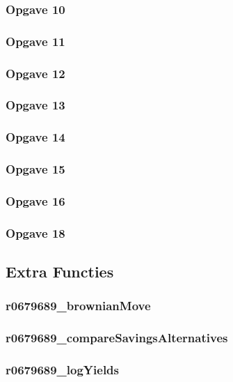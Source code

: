 \documentclass[11pt, a4paper, titlepage, openright]{article}
\begin{document}
		\subsubsection{Opgave 10}
			
		\bigskip
		\subsubsection{Opgave 11}
			
		\bigskip
		\subsubsection{Opgave 12}
			
		\bigskip
		\subsubsection{Opgave 13}
			
		\bigskip
		\subsubsection{Opgave 14}
			
		\bigskip
		\subsubsection{Opgave 15}
			
		\bigskip
		\subsubsection{Opgave 16}
			
		\bigskip
		\subsubsection{Opgave 18}
			
		\bigskip

	\subsection{Extra Functies}
		\subsubsection{r0679689\_brownianMove}
			
		\bigskip
		\subsubsection{r0679689\_compareSavingsAlternatives}
			
		\bigskip
		\subsubsection{r0679689\_logYields}
			
		\bigskip
\end{document}
